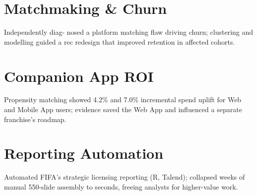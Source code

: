 \section{\large \faGem Matchmaking \& Churn}
Independently diag- nosed a platform matching flaw driving churn; clustering and modelling guided a rec redesign that improved retention in affected cohorts.
%
\section{\large \faGem Companion App ROI}
Propensity matching showed 4.2\% and 7.0\% incremental spend uplift for Web and Mobile App users; evidence saved the Web App and influenced a separate franchise's roadmap.
%
\section{\large \faGem Reporting Automation}
Automated FIFA's strategic licensing reporting (R, Talend); collapsed weeks of manual 550-slide assembly to seconds, freeing analysts for higher-value work.
